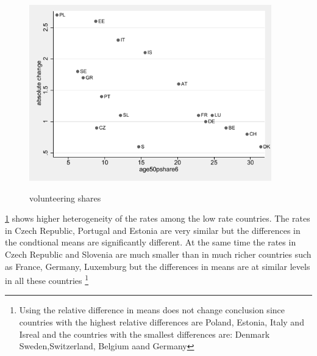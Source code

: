 \documentclass[10pt, letterpaper]{article}
\begin{document}
\begin{spacing}{1.4}
\begin{figure}[H]
 \includegraphics[height=3in]{abs_casp.pdf}
 \centering
 \label{fig:abs_casp}
\caption{volunteering shares}
\end{figure}


\ref{fig:abs_casp} shows higher heterogeneity of the rates among the low rate countries. The rates in Czech Republic, Portugal and Estonia are very similar but the differences in the condtional means are significantly different. At the same time the rates in Czech Republic and Slovenia are much smaller than in much richer countries such as France, Germany, Luxemburg but the differences in means are at similar levels in all these countries \footnote{Using the relative difference in means does not change conclusion since countries with the highest relative differences are Poland, Estonia, Italy and Isreal and the countries with the smallest differences are: Denmark Sweden,Switzerland, Belgium aand Germany}  \\


\end{spacing}
\end{document}
